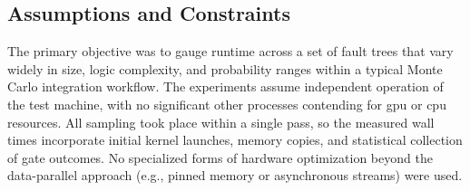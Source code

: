 \subsection{Assumptions and Constraints}
The primary objective was to gauge runtime across a set of fault trees that vary widely in size, logic complexity, and probability ranges within a typical Monte Carlo integration workflow. The experiments assume independent operation of the test machine, with no significant other processes contending for \acrshort{gpu} or \acrshort{cpu} resources. All sampling took place within a single pass, so the measured wall times incorporate initial kernel launches, memory copies, and statistical collection of gate outcomes. No specialized forms of hardware optimization beyond the data-parallel approach (e.g., pinned memory or asynchronous streams) were used.
